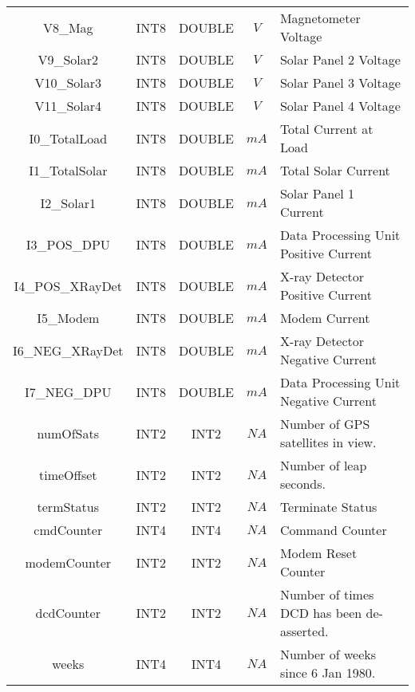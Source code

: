 \documentclass{article}
\begin{document}
\begin{table}[H]
\begin{tabular}{|c|c|c|c|p{4cm}|}
V8\_Mag&INT8&DOUBLE&$V$&Magnetometer Voltage\\
V9\_Solar2&INT8&DOUBLE&$V$&Solar Panel 2  Voltage\\
V10\_Solar3&INT8&DOUBLE&$V$&Solar Panel 3  Voltage\\
V11\_Solar4&INT8&DOUBLE&$V$&Solar Panel 4  Voltage\\
I0\_TotalLoad&INT8&DOUBLE&$mA$&Total Current at Load\\
I1\_TotalSolar&INT8&DOUBLE&$mA$&Total Solar Current\\
I2\_Solar1&INT8&DOUBLE&$mA$&Solar Panel 1 Current\\
I3\_POS\_DPU&INT8&DOUBLE&$mA$&Data Processing Unit Positive Current\\
I4\_POS\_XRayDet&INT8&DOUBLE&$mA$&X-ray Detector Positive Current\\
I5\_Modem&INT8&DOUBLE&$mA$&Modem Current\\
I6\_NEG\_XRayDet&INT8&DOUBLE&$mA$&X-ray Detector Negative Current\\
I7\_NEG\_DPU&INT8&DOUBLE&$mA$&Data Processing Unit Negative Current\\
numOfSats&INT2&INT2&$NA$&Number of GPS satellites in view.\\
timeOffset&INT2&INT2&$NA$&Number of leap seconds.\\
termStatus&INT2&INT2&$NA$&Terminate Status\\
cmdCounter&INT4&INT4&$NA$&Command Counter\\
modemCounter&INT2&INT2&$NA$&Modem Reset Counter\\
dcdCounter&INT2&INT2&$NA$&Number of times DCD has been de-asserted.\\
weeks&INT4&INT4&$NA$&Number of weeks since 6 Jan 1980.\\
\hline
\end{tabular}
\end{table}
\end{document}
